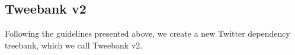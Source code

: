\documentclass[11pt,a4paper]{article}
\newcommand{\yjcomment}[1]{\textcolor{orange}{[$_\mathrm{L}^\mathrm{Y}$#1]}}
\newcommand{\nascomment}[1]{\textcolor{blue}{[#1 ---\textsc{nas}]}}
\begin{document}


\subsection{\sc Tweebank v2}\label{sec:anno-process}
Following the guidelines presented above, we create a new Twitter
dependency treebank, which we call {\sc Tweebank v2}.
\end{document}
